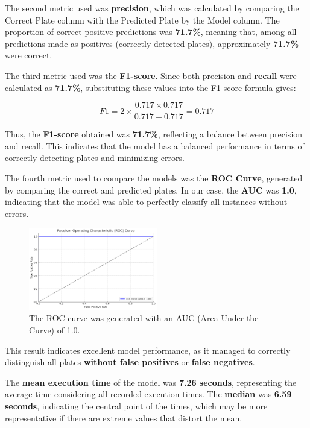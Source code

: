 \documentclass[conference]{IEEEtran}
\begin{document}
	The second metric used was \textbf{precision}, which was calculated by comparing the Correct Plate column with the Predicted Plate by the Model column. The proportion of correct positive predictions was \textbf{71.7\%}, meaning that, among all predictions made as positives (correctly detected plates), approximately \textbf{71.7\%} were correct.
	
	The third metric used was the \textbf{F1-score}. Since both precision and \textbf{recall} were calculated as \textbf{71.7\%}, substituting these values into the F1-score formula gives:
	
	\[
	F1 = 2 \times \frac{0.717 \times 0.717}{0.717 + 0.717} = 0.717
	\]
	
	Thus, the \textbf{F1-score} obtained was \textbf{71.7\%}, reflecting a balance between precision and recall. This indicates that the model has a balanced performance in terms of correctly detecting plates and minimizing errors.
	
	The fourth metric used to compare the models was the \textbf{ROC Curve}, generated by comparing the correct and predicted plates. In our case, the \textbf{AUC} was \textbf{1.0}, indicating that the model was able to perfectly classify all instances without errors.
	
	\begin{figure}[htbp]
		\centerline{\includegraphics[width=0.5\textwidth]{img4.png}}
		\caption{The ROC curve was generated with an AUC (Area Under the Curve) of 1.0.}
		\label{img4}
	\end{figure}
	
	This result indicates excellent model performance, as it managed to correctly distinguish all plates \textbf{without false positives} or \textbf{false negatives}.
	
	The \textbf{mean execution time} of the model was \textbf{7.26 seconds}, representing the average time considering all recorded execution times. The \textbf{median} was \textbf{6.59 seconds}, indicating the central point of the times, which may be more representative if there are extreme values that distort the mean.
	
\end{document}
